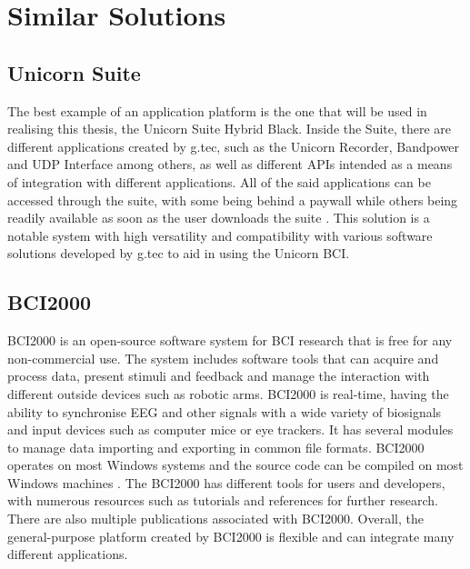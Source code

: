 \section{Similar Solutions}\label{sect:similar solutions}

\subsection{Unicorn Suite}
The best example of an application platform is the one that will be used in realising this thesis, the Unicorn Suite Hybrid Black. Inside the Suite, there are different applications created by g.tec, such as the Unicorn Recorder, Bandpower and UDP Interface among others, as well as different APIs intended as a means of integration with different applications. All of the said applications can be accessed through the suite, with some being behind a paywall while others being readily available as soon as the user downloads the suite \cite{Unicorn_Suite}. This solution is a notable system with high versatility and compatibility with various software solutions developed by g.tec to aid in using the Unicorn BCI.

\subsection{BCI2000}
BCI2000 is an open-source software system for BCI research that is free for any non-commercial use. The system includes software tools that can acquire and process data, present stimuli and feedback and manage the interaction with different outside devices such as robotic arms. BCI2000 is real-time, having the ability to synchronise EEG and other signals with a wide variety of biosignals and input devices such as computer mice or eye trackers. It has several modules to manage data importing and exporting in common file formats. BCI2000 operates on most Windows systems and the source code can be compiled on most Windows machines \cite{BCI2000}. The BCI2000 has different tools for users and developers, with numerous resources such as tutorials and references for further research. There are also multiple publications associated with BCI2000. Overall, the general-purpose platform created by BCI2000 is flexible and can integrate many different applications.

